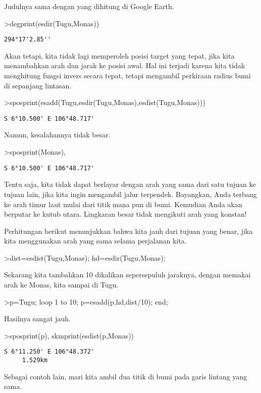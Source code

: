\documentclass[
]{book}
\begin{document}
Judulnya sama dengan yang dihitung di Google Earth.

\textgreater degprint(esdir(Tugu,Monas))

\begin{verbatim}
294°17'2.85''
\end{verbatim}

Akan tetapi, kita tidak lagi memperoleh posisi target yang tepat, jika kita menambahkan arah dan jarak ke posisi awal. Hal ini terjadi karena kita tidak menghitung fungsi invers secara tepat, tetapi mengambil perkiraan radius bumi di sepanjang lintasan.

\textgreater sposprint(esadd(Tugu,esdir(Tugu,Monas),esdist(Tugu,Monas)))

\begin{verbatim}
S 6°10.500' E 106°48.717'
\end{verbatim}

Namun, kesalahannya tidak besar.

\textgreater sposprint(Monas),

\begin{verbatim}
S 6°10.500' E 106°48.717'
\end{verbatim}

Tentu saja, kita tidak dapat berlayar dengan arah yang sama dari satu tujuan ke tujuan lain, jika kita ingin mengambil jalur terpendek. Bayangkan, Anda terbang ke arah timur laut mulai dari titik mana pun di bumi. Kemudian Anda akan berputar ke kutub utara. Lingkaran besar tidak mengikuti arah yang konstan!

Perhitungan berikut menunjukkan bahwa kita jauh dari tujuan yang benar, jika kita menggunakan arah yang sama selama perjalanan kita.

\textgreater dist=esdist(Tugu,Monas); hd=esdir(Tugu,Monas);

Sekarang kita tambahkan 10 dikalikan sepersepuluh jaraknya, dengan memakai arah ke Monas, kita sampai di Tugu.

\textgreater p=Tugu; loop 1 to 10; p=esadd(p,hd,dist/10); end;

Hasilnya sangat jauh.

\textgreater sposprint(p), skmprint(esdist(p,Monas))

\begin{verbatim}
S 6°11.250' E 106°48.372'
     1.529km
\end{verbatim}

Sebagai contoh lain, mari kita ambil dua titik di bumi pada garis lintang yang sama.
\end{document}
